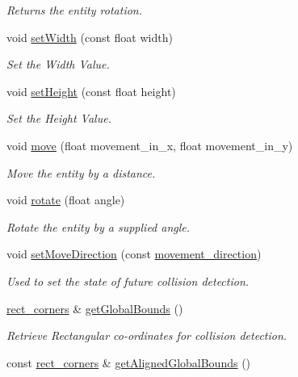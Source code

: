 \begin{DoxyCompactItemize}
\begin{DoxyCompactList}\small\item\em Returns the entity rotation. \end{DoxyCompactList}\item 
void \hyperlink{classOrientation_a1b5cd490e5bbbe2b8d683be389dbcbbe}{set\-Width} (const float width)
\begin{DoxyCompactList}\small\item\em Set the Width Value. \end{DoxyCompactList}\item 
void \hyperlink{classOrientation_a1adca89bc32128e2ca1cb937357f5006}{set\-Height} (const float height)
\begin{DoxyCompactList}\small\item\em Set the Height Value. \end{DoxyCompactList}\item 
void \hyperlink{classOrientation_ae1c8122591724b1b3bfcb0026b76e809}{move} (float movement\-\_\-in\-\_\-x, float movement\-\_\-in\-\_\-y)
\begin{DoxyCompactList}\small\item\em Move the entity by a distance. \end{DoxyCompactList}\item 
void \hyperlink{classOrientation_aa9e115b7f4ab487e3af532592416b247}{rotate} (float angle)
\begin{DoxyCompactList}\small\item\em Rotate the entity by a supplied angle. \end{DoxyCompactList}\item 
void \hyperlink{classOrientation_a478512ba497cd75f11be3aa3177cca6a}{set\-Move\-Direction} (const \hyperlink{Structures_8h_a0d0b88f27f3adf9452879b5d9f829026}{movement\-\_\-direction})
\begin{DoxyCompactList}\small\item\em Used to set the state of future collision detection. \end{DoxyCompactList}\item 
\hyperlink{structrect__corners}{rect\-\_\-corners} \& \hyperlink{classOrientation_a950dfe84e548582d8c3c573b5ff5fe42}{get\-Global\-Bounds} ()
\begin{DoxyCompactList}\small\item\em Retrieve Rectangular co-\/ordinates for collision detection. \end{DoxyCompactList}\item 
const \hyperlink{structrect__corners}{rect\-\_\-corners} \& \hyperlink{classOrientation_a5cc606289f774c8561af98d183586199}{get\-Aligned\-Global\-Bounds} ()

\end{DoxyCompactItemize}
